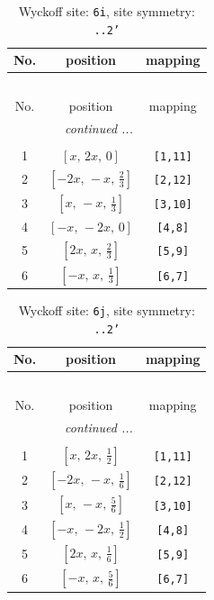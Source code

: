 \documentclass[fleqn,8pt]{jsarticle}
\begin{document}
\renewcommand{\arraystretch}{1.2}
\begin{longtable}{ccc}
\caption{Wyckoff site: {\tt 6i}, site symmetry: {\tt ..2'}}
 \\
 \hline \hline
No. & position & mapping \\ \hline \endfirsthead

\multicolumn{2}{l}{\tablename\ \thetable{}} \\
 \hline \hline
No. & position & mapping \\ \hline \endhead

 \hline \hline
\multicolumn{2}{r}{\footnotesize\it continued ...} \\ \endfoot

 \hline \hline
\multicolumn{2}{r}{} \\ \endlastfoot

1 & $\left[ x,\, 2 x,\, 0 \right]$ & {\tt [1,11]} \\ \hline
2 & $\left[ - 2 x,\, - x,\, \frac{2}{3} \right]$ & {\tt [2,12]} \\ \hline
3 & $\left[ x,\, - x,\, \frac{1}{3} \right]$ & {\tt [3,10]} \\ \hline
4 & $\left[ - x,\, - 2 x,\, 0 \right]$ & {\tt [4,8]} \\ \hline
5 & $\left[ 2 x,\, x,\, \frac{2}{3} \right]$ & {\tt [5,9]} \\ \hline
6 & $\left[ - x,\, x,\, \frac{1}{3} \right]$ & {\tt [6,7]} \\
\end{longtable}
\renewcommand{\arraystretch}{1.2}
\begin{longtable}{ccc}
\caption{Wyckoff site: {\tt 6j}, site symmetry: {\tt ..2'}}
 \\
 \hline \hline
No. & position & mapping \\ \hline \endfirsthead

\multicolumn{2}{l}{\tablename\ \thetable{}} \\
 \hline \hline
No. & position & mapping \\ \hline \endhead

 \hline \hline
\multicolumn{2}{r}{\footnotesize\it continued ...} \\ \endfoot

 \hline \hline
\multicolumn{2}{r}{} \\ \endlastfoot

1 & $\left[ x,\, 2 x,\, \frac{1}{2} \right]$ & {\tt [1,11]} \\ \hline
2 & $\left[ - 2 x,\, - x,\, \frac{1}{6} \right]$ & {\tt [2,12]} \\ \hline
3 & $\left[ x,\, - x,\, \frac{5}{6} \right]$ & {\tt [3,10]} \\ \hline
4 & $\left[ - x,\, - 2 x,\, \frac{1}{2} \right]$ & {\tt [4,8]} \\ \hline
5 & $\left[ 2 x,\, x,\, \frac{1}{6} \right]$ & {\tt [5,9]} \\ \hline
6 & $\left[ - x,\, x,\, \frac{5}{6} \right]$ & {\tt [6,7]} \\
\end{longtable}
\end{document}
